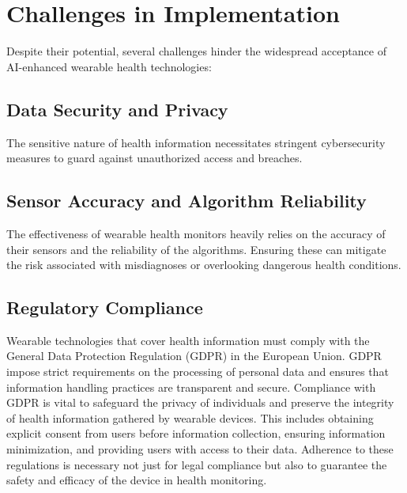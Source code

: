 \section{Challenges in Implementation}
Despite their potential, several challenges hinder the widespread acceptance of
AI-enhanced wearable health technologies:

\subsection{Data Security and Privacy}
The sensitive nature of health information necessitates stringent cybersecurity
measures to guard against unauthorized access and breaches.
\cite{kruse2017cybersecurity}
\newpage

\subsection{Sensor Accuracy and Algorithm Reliability}
The effectiveness of wearable health monitors heavily relies on the accuracy of
their sensors and the reliability of the algorithms. Ensuring these can mitigate
the risk associated with misdiagnoses or overlooking dangerous health
conditions. \cite{huhn2022impact}

\subsection{Regulatory Compliance}
Wearable technologies that cover health information must comply with the General
Data Protection Regulation (GDPR) in the European Union. GDPR impose strict
requirements on the processing of personal data and ensures that information
handling practices are transparent and secure. Compliance with GDPR is vital to
safeguard the privacy of individuals and preserve the integrity of health
information gathered by wearable devices. This includes obtaining explicit
consent from users before information collection, ensuring information
minimization, and providing users with access to their data. Adherence to these
regulations is necessary not just for legal compliance but also to guarantee the
safety and efficacy of the device in health monitoring. \cite{GDPR2016}

